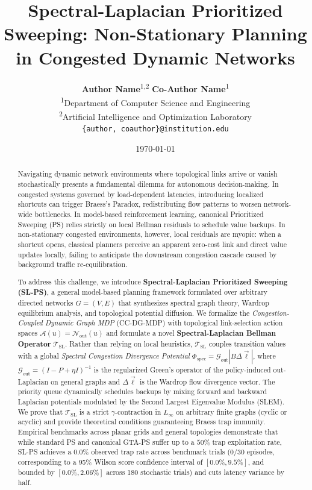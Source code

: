 \documentclass[11pt,a4paper]{article}
\title{\textbf{Spectral-Laplacian Prioritized Sweeping: Non-Stationary Planning in Congested Dynamic Networks}}
\author{
  \textbf{Author Name}\textsuperscript{1,2} \quad \textbf{Co-Author Name}\textsuperscript{1} \\
  \textsuperscript{1}Department of Computer Science and Engineering \\
  \textsuperscript{2}Artificial Intelligence and Optimization Laboratory \\
  \texttt{\{author, coauthor\}@institution.edu}
}
\date{\today}
\begin{document}
\maketitle

\begin{abstract}
Navigating dynamic network environments where topological links arrive or vanish stochastically presents a fundamental dilemma for autonomous decision-making. In congested systems governed by load-dependent latencies, introducing localized shortcuts can trigger Braess's Paradox, redistributing flow patterns to worsen network-wide bottlenecks. In model-based reinforcement learning, canonical Prioritized Sweeping (PS) relies strictly on local Bellman residuals to schedule value backups. In non-stationary congested environments, however, local residuals are myopic: when a shortcut opens, classical planners perceive an apparent zero-cost link and direct value updates locally, failing to anticipate the downstream congestion cascade caused by background traffic re-equilibration.

To address this challenge, we introduce \textbf{Spectral-Laplacian Prioritized Sweeping (SL-PS)}, a general model-based planning framework formulated over arbitrary directed networks $G = (V, E)$ that synthesizes spectral graph theory, Wardrop equilibrium analysis, and topological potential diffusion. We formalize the \textit{Congestion-Coupled Dynamic Graph MDP} (CC-DG-MDP) with topological link-selection action spaces $\mathcal{A}(u) = \mathcal{N}_{\text{out}}(u)$ and formulate a novel \textbf{Spectral-Laplacian Bellman Operator} $\mathcal{T}_{\text{SL}}$. Rather than relying on local heuristics, $\mathcal{T}_{\text{SL}}$ couples transition values with a global \textit{Spectral Congestion Divergence Potential} $\Phi_{\text{spec}} = \mathcal{G}_{\text{out}} |B \Delta \vec{\ell}|$, where $\mathcal{G}_{\text{out}} = (I - P + \eta I)^{-1}$ is the regularized Green's operator of the policy-induced out-Laplacian on general graphs and $\Delta \vec{\ell}$ is the Wardrop flow divergence vector. The priority queue dynamically schedules backups by mixing forward and backward Laplacian potentials modulated by the Second Largest Eigenvalue Modulus (SLEM). We prove that $\mathcal{T}_{\text{SL}}$ is a strict $\gamma$-contraction in $L_\infty$ on arbitrary finite graphs (cyclic or acyclic) and provide theoretical conditions guaranteeing Braess trap immunity. Empirical benchmarks across planar grids and general topologies demonstrate that while standard PS and canonical GTA-PS suffer up to a $50\%$ trap exploitation rate, SL-PS achieves a $0.0\%$ observed trap rate across benchmark trials ($0/30$ episodes, corresponding to a 95\% Wilson score confidence interval of $[0.0\%, 9.5\%]$, and bounded by $[0.0\%, 2.06\%]$ across 180 stochastic trials) and cuts latency variance by half.
\end{abstract}
\end{document}
